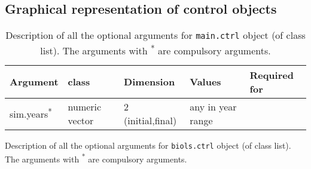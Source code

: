 
\begin{landscape}

\section{Graphical representation of control objects} \label{sec:CtrlObj_tab}

\setcounter{figure}{0} 
\setcounter{table}{0}

\begin{table}[!ht]

  \centering
  \begin{footnotesize}
    
    \caption{Description of all the optional arguments for \texttt{main.ctrl} object (of class list).
    The arguments with \textsuperscript{*} are compulsory arguments.}
    
    \label{tb:A3.table1}
    
    \begin{threeparttable}
    
      \begin{tabular}{lllll} %
        \hline 
        Argument & class & Dimension & Values & Required for \\
        \hline
        sim.years\textsuperscript{*} & numeric vector & 2 (initial,final) & any in year range & \\
        \hline
      \end{tabular}
      
    \end{threeparttable}
  \end{footnotesize}

\end{table}


\begin{table}[!ht]

  \centering
  \begin{footnotesize}
    
    \caption{Description of all the optional arguments for \texttt{biols.ctrl} object (of class list).
    The arguments with \textsuperscript{*} are compulsory arguments.}
    
    \label{tb:A3.table2}
    
    \begin{threeparttable}
    

\end{threeparttable}
\end{footnotesize}
\end{table}
\end{landscape}
